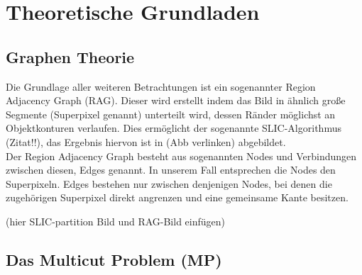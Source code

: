 \chapter{Theoretische Grundladen}\label{ch:theoretischeGrundlagen}
\section{Graphen Theorie}\label{sec:graphTheory}

Die Grundlage aller weiteren Betrachtungen ist ein sogenannter Region Adjacency Graph (RAG). Dieser wird erstellt indem das Bild in ähnlich große Segmente (Superpixel genannt) unterteilt wird, dessen Ränder möglichst an Objektkonturen verlaufen. Dies ermöglicht der sogenannte SLIC-Algorithmus (Zitat!!), das Ergebnis hiervon ist in (Abb verlinken) abgebildet. \\

Der Region Adjacency Graph besteht aus sogenannten Nodes und Verbindungen zwischen diesen, Edges genannt. In unserem Fall entsprechen die Nodes den Superpixeln. Edges bestehen nur zwischen denjenigen Nodes, bei denen die zugehörigen Superpixel direkt angrenzen und eine gemeinsame Kante besitzen. 

(hier SLIC-partition Bild und RAG-Bild einfügen)





\section{Das Multicut Problem (MP)}\label{sec:multicutProb}







